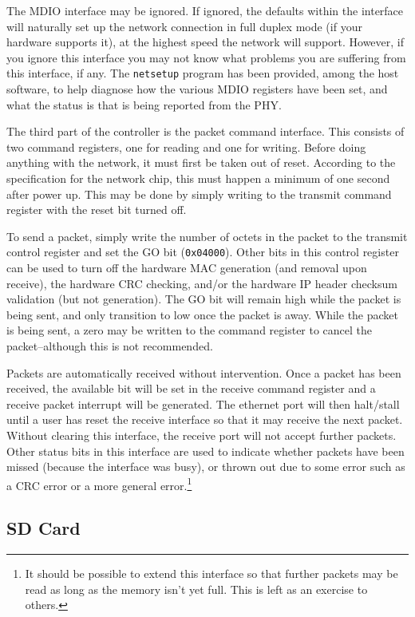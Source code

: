 \documentclass{gqtekspec}
\begin{document}
The MDIO interface may be ignored.  If ignored, the defaults within the
interface will naturally set up the network connection in full duplex mode (if
your hardware supports it), at the highest speed the network will support.  
However, if you ignore this interface you may not know what problems you are
suffering from this interface, if any.  The {\tt netsetup} program has been
provided, among the host software, to help diagnose how the various MDIO
registers have been set, and what the status is that is being reported from
the PHY.

The third part of the controller is the packet command interface.  This
consists of two command registers, one for reading and one for writing.
Before doing anything with the network, it must first be taken out of 
reset.  According to the specification for the network chip, this must
happen a minimum of one second after power up.  This may be done by simply
writing to the transmit command register with the reset bit turned off.

To send a packet, simply write the number of octets in the packet to the
transmit control register and set the GO bit ({\tt 0x04000}).  Other bits
in this control register can be used to turn off the hardware MAC generation
(and removal upon receive), the hardware CRC checking, and/or the hardware
IP header checksum validation (but not generation).  The GO bit will remain
high while the packet is being sent, and only transition to low once the
packet is away.  While the packet is being sent, a zero may be written to the
command register to cancel the packet--although this is not recommended.

Packets are automatically received without intervention.  Once a packet has been
received, the available bit will be set in the receive command register and
a receive packet interrupt will be generated.  The ethernet port will then
halt/stall until a user has reset the receive interface so that it may
receive the next packet.  Without clearing this interface, the receive port
will not accept further packets.  Other status bits in this interface are
used to indicate whether packets have been missed (because the interface was
busy), or thrown out due to some error such as a CRC error or a more general
error.\footnote{It should be possible to extend this interface so that further
packets may be read as long as the memory isn't yet full.  This is left as an
exercise to others.}

\subsection{SD Card}
\end{document}

